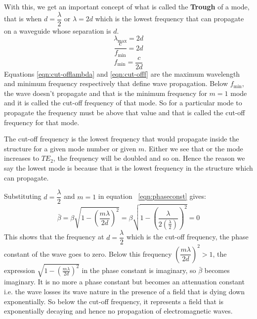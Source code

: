 With this, we get an important concept of what is called the \textbf{Trough} of a mode, that is when $d = \dfrac{\lambda}{2}$ or $\lambda = 2d$ which is the lowest frequency that can propagate on a waveguide whose separation is $d$.
\begin{dmath}
\lambda_\max = 2d
\label{eqn:cut-offlambda}
\end{dmath}
\begin{dmath*}
\frac{c}{f_\min} = 2d
\end{dmath*}
\begin{dmath}
f_\min = \frac{c}{2d}
\label{eqn:cut-offf}
\end{dmath}
Equations \ref{eqn:cut-offlambda} and \ref{eqn:cut-offf} are the maximum wavelength and minimum frequency respectively that define wave propagation. Below $f_\min$, the wave doesn't propagate and that is the minimum frequency for $m=1$ mode and it is called the cut-off frequency of that mode. So for a particular mode to propagate the frequency must be above that value and that is called the cut-off frequency for that mode.

The cut-off frequency is the lowest frequency that would propagate inside the structure for a given mode number or given $m$. Either we see that or the mode increases to $TE_2$, the frequency will be doubled and so on. Hence the reason we say the lowest mode is because that is the lowest frequency in the structure which can propagate.

Substituting $d=\dfrac{\lambda}{2}$ and $m=1$ in equation ~\ref{eqn:phaseconst} gives:
\begin{dmath*}
\bar{\beta} = \beta\sqrt{1 - \left(\frac{m\lambda}{2d}\right)^2} =  \beta\sqrt{1 - \left(\frac{\lambda}{2\left(\frac{\lambda}{2}\right)}\right)^2} = 0
\end{dmath*}
This shows that the frequency at $d=\dfrac{\lambda}{2}$ which is the cut-off frequency, the phase constant of the wave goes to zero. Below this frequency $\left(\dfrac{m\lambda}{2d}\right)^2 > 1$, the expression $\sqrt{1 - \left(\frac{m\lambda}{2d}\right)^2}$ in the phase constant is imaginary, so $\bar{\beta}$ becomes imaginary. It is no more a phase constant but becomes an attenuation constant i.e. the wave losses its wave nature in the presence of a field that is dying down exponentially. So below the cut-off frequency, it represents a field that is exponentially decaying and hence no propagation of electromagnetic waves.

